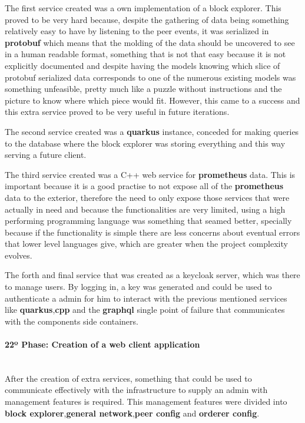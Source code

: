 The first service created was a own implementation of a block explorer. This proved to be very hard because, despite the gathering of data being something relatively easy to have by listening to the peer events, it was serialized in \textbf{protobuf} which means that the molding of the data should be uncovered to see in a human readable format, something that is not that easy because it is not explicitly documented and despite having the models knowing which slice of protobuf serialized data corresponds to one of the numerous existing models was something unfeasible, pretty much like a puzzle without instructions and the picture to know where which piece would fit. However, this came to a success and this extra service proved to be very useful in future iterations.

The second service created was a \textbf{quarkus} instance, conceded for making queries to the database where the block explorer was storing everything and this way serving a future client.

The third service created was a C++ web service for \textbf{prometheus} data. This is important because it is a good practise to not expose all of the \textbf{prometheus} data to the exterior, therefore the need to only expose those services that were actually in need and because the functionalities are very limited, using a high performing programming language was something that seamed better, specially because if the functionality is simple there are less concerns about eventual errors that lower level languages give, which are greater when the project complexity evolves.

The forth and final service that was created as a keycloak server, which was there to manage users. By logging in, a key was generated and could be used to authenticate a admin for him to interact with the previous mentioned services like \textbf{quarkus},\textbf{cpp} and the \textbf{graphql} single point of failure that communicates with the components side containers.

\paragraph{22º Phase: Creation of a web client application}\mbox{}\\
After the creation of extra services, something that could be used to communicate effectively with the infrastructure to supply an admin with management features is required. This management features were divided into \textbf{block explorer},\textbf{general network},\textbf{peer config} and \textbf{orderer config}.

